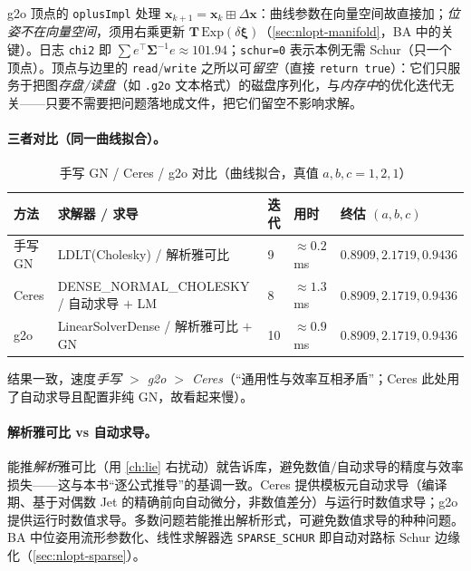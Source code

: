 \noindent g2o 顶点的 \texttt{oplusImpl} 处理 $\mathbf{x}_{k+1}=\mathbf{x}_k\boxplus\Delta\mathbf{x}$：曲线参数在向量空间故直接加；\emph{位姿不在向量空间}，须用右乘更新 $\mathbf{T}\,\mathrm{Exp}(\delta\boldsymbol{\xi})$（\cref{sec:nlopt-manifold}，BA 中的关键）。日志 \texttt{chi2} 即 $\sum e^\top\boldsymbol{\Sigma}^{-1}e\approx101.94$；\texttt{schur=0} 表示本例无需 Schur（只一个顶点）。顶点与边里的 \texttt{read}/\allowbreak\texttt{write} 之所以可\emph{留空}（直接 \texttt{return true}）：它们只服务于把图\emph{存盘/读盘}（如 \texttt{.g2o} 文本格式）的磁盘序列化，与\emph{内存中}的优化迭代无关——只要不需要把问题落地成文件，把它们留空不影响求解\cite{gaoxiang2019slam14}。

\paragraph{三者对比（同一曲线拟合）。}\cite{gaoxiang2019slam14}

\begin{table}[H]\centering\small
\caption{手写 GN / Ceres / g2o 对比（曲线拟合，真值 $a,b,c=1,2,1$）}
\label{tab:nlopt-three}
\begin{tabular}{lllll}
\toprule
方法 & 求解器 / 求导 & 迭代 & 用时 & 终估 $(a,b,c)$ \\
\midrule
手写 GN & LDLT(Cholesky) / 解析雅可比 & 9 & $\approx0.2$ ms & $0.8909,2.1719,0.9436$ \\
Ceres & DENSE\_NORMAL\_CHOLESKY / 自动求导 $+$ LM & 8 & $\approx1.3$ ms & $0.8909,2.1719,0.9436$ \\
g2o & LinearSolverDense / 解析雅可比 $+$ GN & 10 & $\approx0.9$ ms & $0.8909,2.1719,0.9436$ \\
\bottomrule
\end{tabular}
\end{table}

\noindent 结果一致，速度\emph{手写 $>$ g2o $>$ Ceres}（“通用性与效率互相矛盾”；Ceres 此处用了自动求导且配置非纯 GN，故看起来慢）。

\paragraph{解析雅可比 vs 自动求导。}\cite{gaoxiang2019slam14}
能推\emph{解析}雅可比（用 \cref{ch:lie} 右扰动）就告诉库，避免数值/自动求导的精度与效率损失——这与本书“逐公式推导”的基调一致。Ceres 提供模板元自动求导（编译期、基于对偶数 Jet 的精确前向自动微分，非数值差分）与运行时数值求导；g2o 提供运行时数值求导。多数问题若能推出解析形式，可避免数值求导的种种问题。BA 中位姿用流形参数化、线性求解器选 \texttt{SPARSE\_SCHUR} 即自动对路标 Schur 边缘化（\cref{sec:nlopt-sparse}）。

